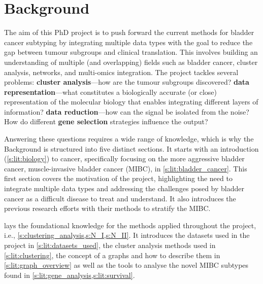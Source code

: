 

\chapter{Background} \label{s:lit_review_intro}


The aim of this PhD project is to push forward the current methods for bladder cancer subtyping by integrating multiple data types with the goal to reduce the gap between tumour subgroups and clinical translation. This involves building an understanding of multiple (and overlapping) fields such as bladder cancer, cluster analysis, networks, and multi-omics integration. The project tackles several problems: \textbf{cluster analysis}—how are the tumour subgroups discovered? \textbf{data representation}—what constitutes a biologically accurate (or close) representation of the molecular biology that enables integrating different layers of information? \textbf{data reduction}—how can the signal be isolated from the noise? How do different \textbf{gene selection} strategies influence the output?

Answering these questions requires a wide range of knowledge, which is why the Background is structured into five distinct sections. It starts with an introduction (\cref{s:lit:biology}) to cancer, specifically focusing on the more aggressive bladder cancer, muscle-invasive bladder cancer (MIBC), in \cref{s:lit:bladder_cancer}. This first section covers the motivation of the project, highlighting the need to integrate multiple data types and addressing the challenges posed by bladder cancer as a difficult disease to treat and understand. It also introduces the previous research efforts with their methods to stratify the MIBC.

 lays the foundational knowledge for the methods applied throughout the project, i.e., \cref{s:clustering_analysis,s:N_I,s:N_II}. It introduces the datasets used in the project in \cref{s:lit:datasets_used}, the cluster analysis methods used in \cref{s:lit:clustering}, the concept of a graphs and how to describe them in \cref{s:lit:graph_overview} as well as the tools to analyse the novel MIBC subtypes found in \cref{s:lit:gene_analysis,s:lit:survival}. 


